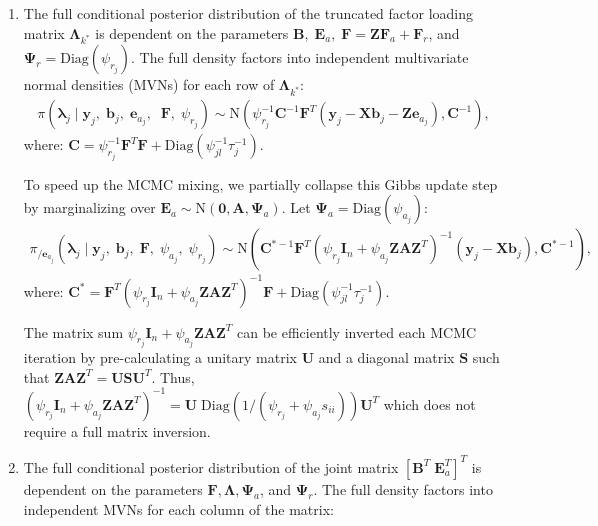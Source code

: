 \documentclass[12pt,titlepage]{article}
\begin{document}
\begin{enumerate}

\item 
\label{step:lambda}
The full conditional posterior distribution of the truncated factor loading matrix $\mathbf{\Lambda}_{k^*}$ is dependent on the parameters $\mathbf{B}, \; \mathbf{E}_a, \;\mathbf{F} = \mathbf{Z} \mathbf{F}_a + \mathbf{F}_r$, and $\mathbf{\Psi}_r = \mbox{Diag}(\psi_{r_j})$. The full density factors into independent multivariate normal densities (MVNs) for each row of $\mathbf{\Lambda}_{k^*}$:
\begin{align*}
\pi(\pmb{\lambda}_j \mid \mathbf{y}_j, \; \mathbf{b}_j, \; \mathbf{e}_{a_j}, \;  \; \mathbf{F}, \; \psi_{r_j})
\sim \mbox{N}(\psi^{-1}_{r_j}\mathbf{C}^{-1}\mathbf{F}^T(\mathbf{y}_j - \mathbf{X}\mathbf{b}_j - \mathbf{Z} \mathbf{e}_{a_j}),\mathbf{C}^{-1}),
\end{align*}
\noindent where: $\mathbf{C} = \psi^{-1}_{r_j}\mathbf{F}^T\mathbf{F} + \mbox{Diag}(\psi^{-1}_{jl}\tau^{-1}_j)$.

To speed up the MCMC mixing, we partially collapse this Gibbs update step by marginalizing over $\mathbf{E}_a\sim \mbox{N}(\mathbf{0},\mathbf{A},\mathbf{\Psi}_a)$. Let $\mathbf{\Psi}_a = \mbox{Diag}(\psi_{a_j})$:
\begin{align*}
\pi_{/\mathbf{e}_{a_j}}(\pmb{\lambda}_j \mid  \mathbf{y}_j, \; \mathbf{b}_j, \;  \mathbf{F}, \; \psi_{a_j}, \; \psi_{r_j})
\sim \mbox{N}(\mathbf{C}^{*-1}\mathbf{F}^T(\psi_{r_j}\mathbf{I}_n + \psi_{a_j}\mathbf{Z}\mathbf{A}\mathbf{Z}^T)^{-1}(\mathbf{y}_j - \mathbf{X}\mathbf{b}_j),\mathbf{C}^{*-1}),
\end{align*}
\noindent where: $\mathbf{C}^* = \mathbf{F}^T(\psi_{r_j}\mathbf{I}_n + \psi_{a_j}\mathbf{ZAZ}^T)^{-1}\mathbf{F} + \mbox{Diag}(\psi^{-1}_{jl}\tau^{-1}_j)$. 

The matrix sum $\psi_{r_j}\mathbf{I}_n + \psi_{a_j}\mathbf{Z}\mathbf{A}\mathbf{Z}^T$ can be efficiently inverted each MCMC iteration by pre-calculating a unitary matrix $\mathbf{U}$ and a diagonal matrix $\mathbf{S}$ such that $\mathbf{Z}\mathbf{A}\mathbf{Z}^T = \mathbf{U}\mathbf{S}\mathbf{U}^T$. Thus, $(\psi_{r_j}\mathbf{I}_n + \psi_{a_j}\mathbf{ZAZ}^T)^{-1} = \mathbf{U}\;\mbox{Diag}(1/(\psi_{r_j} + \psi_{a_j}s_{ii}))\mathbf{U}^T$ which does not require a full matrix inversion.

\item 
\label{step:BEa}
The full conditional posterior distribution of the joint matrix $[\mathbf{B}^T\;\mathbf{E}_a^T]^T$ is dependent on the parameters $\mathbf{F}, \mathbf{\Lambda}, \mathbf{\Psi}_a$, and $\mathbf{\Psi}_r$. The full density factors into independent MVNs for each column of the matrix:


\end{enumerate}
\end{document}
